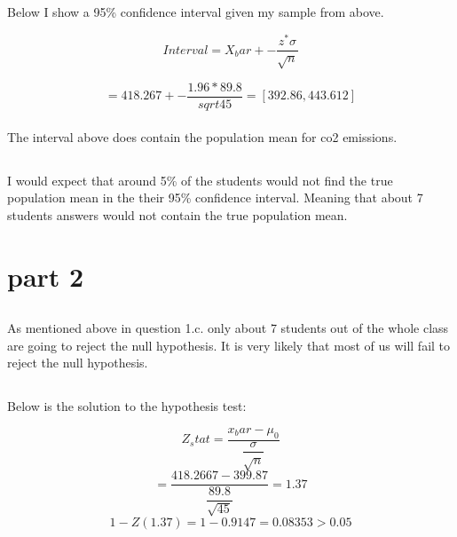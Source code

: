 \documentclass[letterpaper, onecolumn,10pt]{IEEEtran}
\begin{document}
            \subsection{}
                Below I show a 95\% confidence interval given my sample from above.
                
                \[
                    Interval = X_bar +- \dfrac{z^* \sigma}{\sqrt{n}} 
                \]
                
                \[
                    = 418.267 +- \dfrac{1.96 * 89.8}{sqrt{45}} = [392.86 , 443.612]
                \]\\
                
                The interval above does contain the population mean for co2 emissions.\\
            
            \subsection{}
                I would expect that around 5\% of the students would not find the true population mean in the their 95\% confidence interval. Meaning that about 7 students answers would not contain the true population mean.\\
                
        \section{part 2}
            \subsection{}
                As mentioned above in question 1.c. only about 7 students out of the whole class are going to reject the null hypothesis. It is very likely that most of us will fail to reject the null hypothesis.\\
                
            \subsection{}
                Below is the solution to the hypothesis test:
                
                \[
                    Z_stat = \dfrac{x_bar - \mu_0}{\dfrac{\sigma}{\sqrt{n}}}
                \]
                \[
                    = \dfrac{418.2667 - 399.87}{\dfrac{89.8}{\sqrt{45}}} = 1.37
                \]
                \[
                    1 - Z(1.37) = 1 - 0.9147 = 0.08353 > 0.05
                \]
\end{document}
